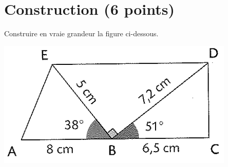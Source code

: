 \section{Construction (6 points)}

\begin{questions}
	\question[3] Construire en vraie grandeur la figure ci-dessous.
	\begin{center}
		\includegraphics[scale=0.7]{img/figure}
	\end{center}

	\question 
\end{questions}